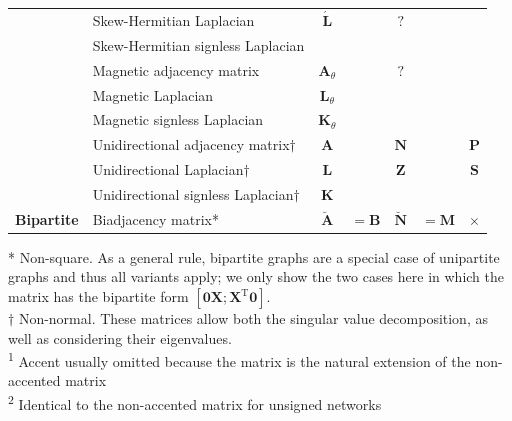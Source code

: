 \documentclass{article}
\begin{document}
\begin{table}
{\begin{tabular}{ l l c@{\;}l c@{\;}l c }
    & Skew-Hermitian Laplacian    			& $\mathbf{\acute L}$ && $?$ \\
    & Skew-Hermitian signless Laplacian 		& & &\\
    \cmidrule(lr){2-7}
    & Magnetic adjacency matrix 			& $\mathbf A_{\theta}$  && $?$ \\
    & Magnetic Laplacian				& $\mathbf L_{\theta}$  && \\
    & Magnetic signless Laplacian			& $\mathbf K_{\theta}$  && \\
    \cmidrule(lr){2-7}
    & Unidirectional adjacency matrix$\dagger$		& $\mathbf A$   && $\mathbf N$ && $\mathbf P$ \\
    & Unidirectional Laplacian$\dagger$			& $\mathbf L$   && $\mathbf Z$ && $\mathbf S$ \\
    & Unidirectional signless Laplacian$\dagger$	& $\mathbf K$   && \\
    \midrule
    \multirow{1}{*}{\textbf{Bipartite}} 
    & Biadjacency matrix*				& $\mathbf{\breve A}$&$=\mathbf B$ & $\mathbf{\breve N}$&$=\mathbf M$ & $\times$ \\
    \bottomrule
  \end{tabular}
  }
  * Non-square. As a general rule, bipartite graphs are a special case
  of unipartite graphs and thus all variants apply; we only show the two
  cases here in which the matrix has the bipartite form $[\mathbf 0
    \mathbf X; \mathbf X^{\mathrm T} \mathbf 0]$. \\
  $\dagger$ Non-normal.  These matrices allow both the singular value
  decomposition, as well as considering their eigenvalues.  \\
  \textsuperscript{1} Accent usually omitted because the matrix is the natural extension of the non-accented matrix \\
  \textsuperscript{2} Identical to the non-accented matrix for unsigned networks 
\end{table}
\end{document}
